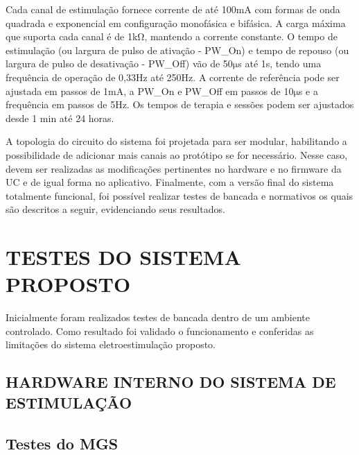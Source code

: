 Cada canal de estimulação fornece corrente de até 100mA com formas de onda quadrada e exponencial em configuração monofásica e bifásica. A carga máxima que suporta cada canal é de 1k$\mathrm{\Omega}$, mantendo a corrente constante. O tempo de estimulação (ou largura de pulso de ativação - PW\_On) e tempo de repouso (ou largura de pulso de desativação - PW\_Off) vão de 50$\mathrm{\mu}$s até 1s, tendo uma frequência de operação de 0,33Hz até 250Hz. A corrente de referência pode ser ajustada em passos de 1mA, a PW\_On e PW\_Off em passos de 10$\mathrm{\mu}$s e a frequência em passos de 5Hz. Os tempos de terapia e sessões podem ser ajustados desde 1 min até 24 horas.

A topologia do circuito do sistema foi projetada para ser modular, habilitando a possibilidade de adicionar mais canais ao protótipo se for necessário. Nesse caso, devem ser realizadas as modificações pertinentes no hardware e no firmware da \acrshort{UC} e de igual forma no aplicativo. Finalmente, com a versão final do sistema totalmente funcional, foi possível realizar testes de bancada e normativos os quais são descritos a seguir, evidenciando seus resultados. 


\section{TESTES DO SISTEMA PROPOSTO} 
Inicialmente foram realizados testes de bancada dentro de um ambiente controlado. Como resultado foi validado o funcionamento e conferidas as limitações do sistema eletroestimulação proposto. 

\subsection{HARDWARE INTERNO DO SISTEMA DE ESTIMULAÇÃO}

\subsection*{Testes do MGS}

